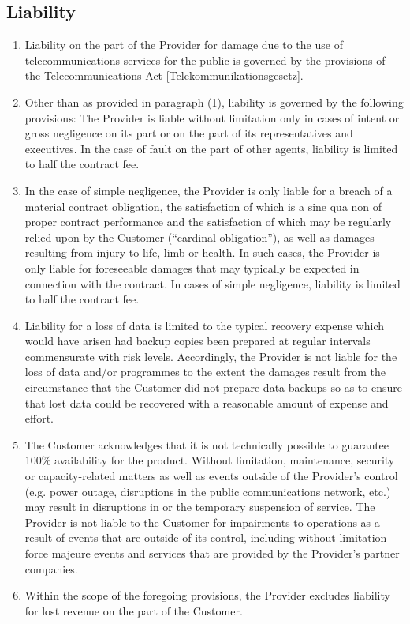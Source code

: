 \documentclass{terms}
\begin{document}
\subsection{Liability}
\begin{enumerate}
\item Liability on the part of the Provider for damage due to the use of telecommunications services for the public is governed by the provisions of the Telecommunications Act [Telekommunikationsgesetz].
\item Other than as provided in paragraph (1), liability is governed by the following provisions: The Provider is liable without limitation only in cases of intent or gross negligence on its part or on the part of its representatives and executives.
      In the case of fault on the part of other agents, liability is limited to half the contract fee.
\item In the case of simple negligence, the Provider is only liable for a breach of a material contract obligation, the satisfaction of which is a sine qua non of proper contract performance and the satisfaction of which may be regularly relied upon by the Customer (“cardinal obligation”), as well as damages resulting from injury to life, limb or health.
      In such cases, the Provider is only liable for foreseeable damages that may typically be expected in connection with the contract.
      In cases of simple negligence, liability is limited to half the contract fee.
\item Liability for a loss of data is limited to the typical recovery expense which would have arisen had backup copies been prepared at regular intervals commensurate with risk levels.
      Accordingly, the Provider is not liable for the loss of data and/or programmes to the extent the damages result from the circumstance that the Customer did not prepare data backups so as to ensure that lost data could be recovered with a reasonable amount of expense and effort.
\item The Customer acknowledges that it is not technically possible to guarantee 100\% availability for the product.
      Without limitation, maintenance, security or capacity-related matters as well as events outside of the Provider's control (e.g. power outage, disruptions in the public communications network, etc.) may result in disruptions in or the temporary suspension of service.
      The Provider is not liable to the Customer for impairments to operations as a result of events that are outside of its control, including without limitation force majeure events and services that are provided by the Provider's partner companies.
\item Within the scope of the foregoing provisions, the Provider excludes liability for lost revenue on the part of the Customer.
\end{enumerate}
\end{document}
